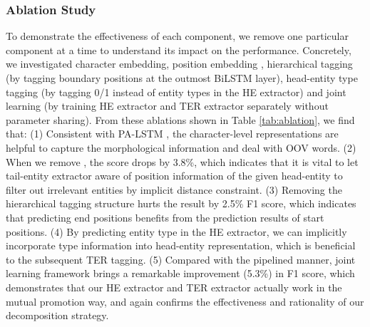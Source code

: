 \documentclass{ecai}
\begin{document}
 
 
 \subsubsection{Ablation Study}
 
 

  To demonstrate the effectiveness of each component, we remove one particular component at a time to understand its impact on the performance. Concretely, we investigated character embedding, position embedding , hierarchical tagging (by tagging boundary positions at the outmost BiLSTM layer), head-entity type tagging (by tagging 0/1 instead of entity types in the HE extractor) and joint learning (by training HE extractor and TER extractor separately without parameter sharing).
  From these ablations shown in Table \ref{tab:ablation}, we find that: 
 (1) Consistent with PA-LSTM \cite{dai2019joint}, the character-level representations are helpful to capture the morphological information and deal with OOV words.
(2) When we remove , the score drops by 3.8\%, which indicates that it is vital to let tail-entity extractor aware of position information of the given head-entity to filter out irrelevant entities by implicit distance constraint. 
  (3) Removing the hierarchical tagging structure hurts the result by 2.5\% F1 score, which indicates that predicting end positions benefits from the prediction results of start positions. 
  (4) By predicting entity type in the HE extractor, we can implicitly incorporate type information into head-entity representation, which is beneficial to the subsequent TER tagging. 
  (5) Compared with the pipelined manner, joint learning framework brings a remarkable improvement (5.3\%) in F1 score, which demonstrates that our HE extractor and TER extractor actually work in the mutual promotion way, and again confirms the effectiveness and rationality of our decomposition strategy.
  
  


  
















  
\end{document}
